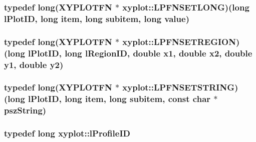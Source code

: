\hypertarget{namespacexyplot_a6baf918a5bfe565a879b9d4fe5ef1124}{
\subsubsection[{L\-P\-F\-N\-S\-E\-T\-L\-O\-N\-G}]{\setlength{\rightskip}{0pt plus 5cm}typedef {\bf long}({\bf X\-Y\-P\-L\-O\-T\-F\-N} $\ast$ xyplot\-::\-L\-P\-F\-N\-S\-E\-T\-L\-O\-N\-G)({\bf long} l\-Plot\-I\-D, {\bf long} item, {\bf long} subitem, {\bf long} value)}}\label{namespacexyplot_a6baf918a5bfe565a879b9d4fe5ef1124}
\hypertarget{namespacexyplot_a048931557c2d0bfaa041629319bb118d}{
\subsubsection[{L\-P\-F\-N\-S\-E\-T\-R\-E\-G\-I\-O\-N}]{\setlength{\rightskip}{0pt plus 5cm}typedef {\bf long}({\bf X\-Y\-P\-L\-O\-T\-F\-N} $\ast$ xyplot\-::\-L\-P\-F\-N\-S\-E\-T\-R\-E\-G\-I\-O\-N)({\bf long} l\-Plot\-I\-D, {\bf long} l\-Region\-I\-D, double x1, double x2, double y1, double y2)}}\label{namespacexyplot_a048931557c2d0bfaa041629319bb118d}
\hypertarget{namespacexyplot_a9bb3deed6ff9723181f09eb590fdf7dd}{
\subsubsection[{L\-P\-F\-N\-S\-E\-T\-S\-T\-R\-I\-N\-G}]{\setlength{\rightskip}{0pt plus 5cm}typedef {\bf long}({\bf X\-Y\-P\-L\-O\-T\-F\-N} $\ast$ xyplot\-::\-L\-P\-F\-N\-S\-E\-T\-S\-T\-R\-I\-N\-G)({\bf long} l\-Plot\-I\-D, {\bf long} item, {\bf long} subitem, const char $\ast$psz\-String)}}\label{namespacexyplot_a9bb3deed6ff9723181f09eb590fdf7dd}
\hypertarget{namespacexyplot_a37f2e7672aa877ee74f4ab91e6a97a88}{
\subsubsection[{l\-Profile\-I\-D}]{\setlength{\rightskip}{0pt plus 5cm}typedef {\bf long} {\bf xyplot\-::l\-Profile\-I\-D}}}\label{namespacexyplot_a37f2e7672aa877ee74f4ab91e6a97a88}
